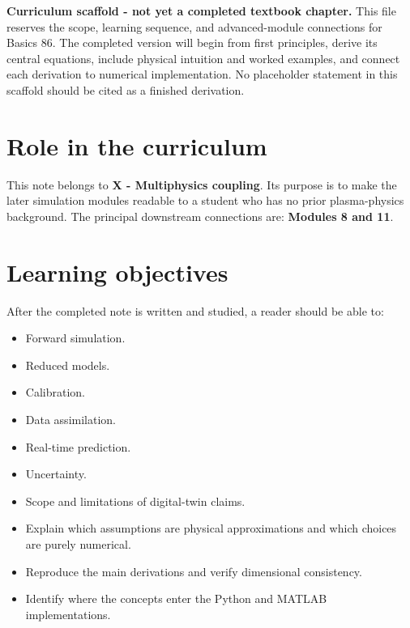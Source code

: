 \documentclass[11pt]{article}
\begin{document}

\begin{overviewbox}
\textbf{Curriculum scaffold - not yet a completed textbook chapter.} This file reserves the scope, learning sequence, and advanced-module connections for Basics 86. The completed version will begin from first principles, derive its central equations, include physical intuition and worked examples, and connect each derivation to numerical implementation. No placeholder statement in this scaffold should be cited as a finished derivation.
\end{overviewbox}

\ProjectTOC

\section{Role in the curriculum}
This note belongs to \textbf{X - Multiphysics coupling}. Its purpose is to make the later simulation modules readable to a student who has no prior plasma-physics background. The principal downstream connections are: \textbf{Modules 8 and 11}.

\section{Learning objectives}
After the completed note is written and studied, a reader should be able to:
\begin{itemize}[leftmargin=1.6em]
\item Forward simulation.
\item Reduced models.
\item Calibration.
\item Data assimilation.
\item Real-time prediction.
\item Uncertainty.
\item Scope and limitations of digital-twin claims.
\item Explain which assumptions are physical approximations and which choices are purely numerical.
\item Reproduce the main derivations and verify dimensional consistency.
\item Identify where the concepts enter the Python and MATLAB implementations.
\end{itemize}
\end{document}
